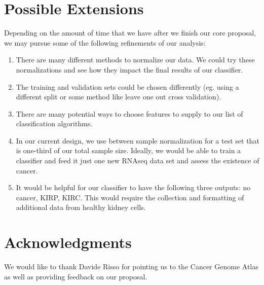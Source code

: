 \section{Possible Extensions}

Depending on the amount of time that we have after we finish our core proposal,
we may pursue some of the following refinements of our analysis:

\begin{enumerate}

\item There are many different methods to normalize our data. We could try
these normalizations and see how they impact the final results of our
classifier. 

\item The training and validation sets could be chosen differently (eg. using a
different split or some method like leave one out cross validation). 

\item There are many potential ways to choose features to supply to our list of
classification algorithms. 

\item In our current design, we use between sample normalization for a test set
that is one-third of our total sample size. Ideally, we would be able to train
a classifier and feed it just one new RNAseq data set and assess the existence
of cancer. 

\item It would be helpful for our classifier to have the following three
outputs: no cancer, KIRP, KIRC. This would require the collection and
formatting of additional data from healthy kidney cells. 

\end{enumerate}

\section*{Acknowledgments}
We would like to thank Davide Risso for pointing us to the Cancer Genome
Atlas as well as providing feedback on our proposal.


